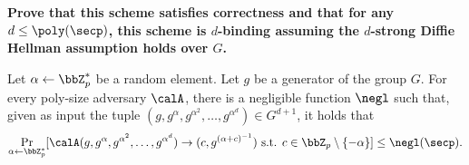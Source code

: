 \documentclass{article}
\begin{document}
\textbf{Prove that this scheme satisfies correctness and that for any $d \le \poly(\secp)$, this scheme is $d$-binding assuming the $d$-strong Diffie Hellman assumption holds over $G$.}

\begin{definition}
    Let $\alpha \gets \bbZ_p^*$ be a random element. Let $g$ be a generator of the group $G$. For every poly-size adversary $\calA$, there is a negligible function $\negl$ such that, given as input the tuple $(g, g^\alpha, g^{\alpha^2}, \ldots, g^{\alpha^d}) \in G^{d+1}$, it holds that
    \begin{align*}
        \Pr_{\alpha \gets \bbZ_p^*}[\calA(g, g^\alpha, g^{\alpha^2}, \ldots, g^{\alpha^d}) \to (c, g^{(\alpha + c)^{-1}}) \text{ s.t. } c \in \bbZ_p \setminus \{-\alpha\}] \le \negl(\secp).
    \end{align*}
\end{definition}
\end{document}
